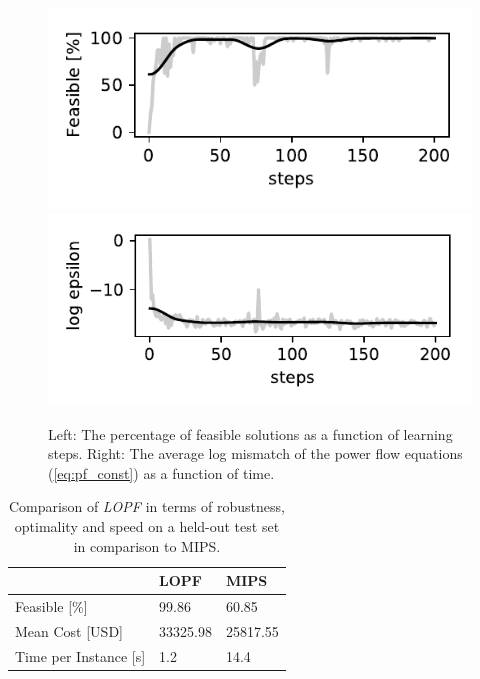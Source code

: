\begin{figure}[!ht]
    \centering
    \includegraphics[width=0.48\linewidth]{krtofl/violation_percentage.pdf}
    \includegraphics[width=0.48\linewidth]{krtofl/epsilon_epoch.pdf}
    \caption{Left: The percentage of feasible solutions as a function of learning steps. Right: The average log mismatch of the power flow equations (\ref{eq:pf_const}) as a function of time.}
    \label{lopf:violations}
\end{figure}

\begin{table}[]
\centering
\large
\begin{tabular}{| l | l | l |}
\hline
          & LOPF & MIPS   \\
          \hline
Feasible [\%] & 99.86  & 60.85 \\
Mean Cost [USD] & 33325.98 & 25817.55\\
Time per Instance [s] & 1.2 & 14.4\\
\hline
\end{tabular}
\caption[LOPF: Performance comparison]{Comparison of \emph{LOPF} in terms of robustness, optimality and speed on a held-out test set in comparison to MIPS.}
\label{lopf:res_table}
\end{table}

